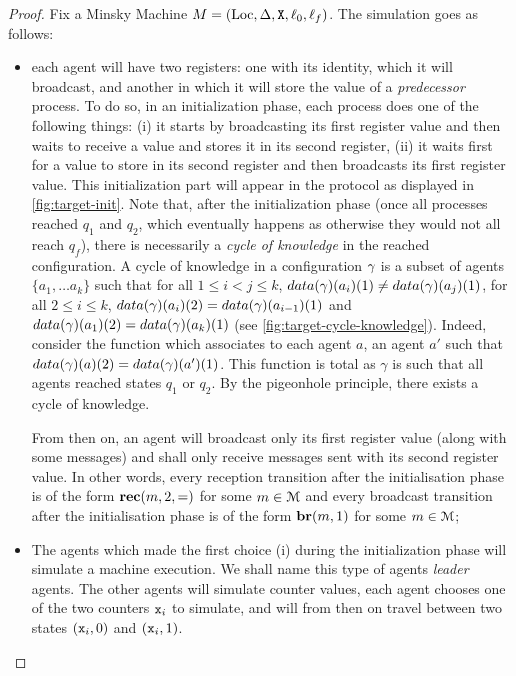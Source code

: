 \begin{proof}
	
	
	
	Fix a Minsky Machine $M= (\text{Loc}, \Delta, \mathtt{X}, \ell_0, \ell_f)$. The simulation goes as follows: 
	\begin{itemize}
		\item each agent will have two registers: one with its identity, which it will broadcast, and another in which it will store the value of a \emph{predecessor} process. To do so, in an initialization phase, each process does one of the following things: (i) it starts by broadcasting its first register value and then waits to receive a value and stores it in its second register, (ii) it waits first for a value to store in its second register and then broadcasts its first register value. This initialization part will appear in the protocol as displayed in \cref{fig:target-init}. Note that, after the initialization phase (once all processes reached $q_1$ and $q_2$, which eventually happens as otherwise they would not all reach $q_f$), there is necessarily a \emph{cycle of knowledge} in the reached configuration. A cycle of knowledge in a configuration $\gamma$ is a subset of agents $\{a_1, \dots a_k\}$ such that for all $1 \leq i < j \leq k$, $\data{\config}(a_i)(1) \ne \data{\config}(a_j)(1)$, for all $2 \leq i \leq k$, $\data{\config}(a_i)(2) = \data{\config}(a_{i-1})(1)$ and $\data{\config}(a_1)(2) = \data{\config}(a_{k})(1)$ (see \cref{fig:target-cycle-knowledge}). Indeed, consider the function which associates to each agent $a$, an agent $a'$ such that $\data{\config}(a)(2) = \data{\config}(a')(1)$. This function is total as $\gamma$ is such that all agents reached states $q_1$ or $q_2$. By the pigeonhole principle, there exists a cycle of knowledge.
		
		From then on, an agent will broadcast only its first register value (along with some messages) and shall only receive messages sent with its second register value. In other words, every reception transition after the initialisation phase is of the form $\textbf{rec}(m, 2, =)$ for some $m \in \mathcal{M}$ and every broadcast transition after the initialisation  phase is of the form $\textbf{br}(m, 1)$ for some $m \in \mathcal{M}$;
		
		\item The agents which made the first choice (i) during the initialization phase will simulate a machine execution. We shall name this type of agents \emph{leader} agents.  
		The other agents will simulate counter values, each agent chooses one of the two counters $\mathtt{x}_i$ to simulate, and will from then on travel between two states $(\mathtt{x}_i, 0)$ and $(\mathtt{x}_i, 1)$.
		

\end{itemize}
\end{proof}
